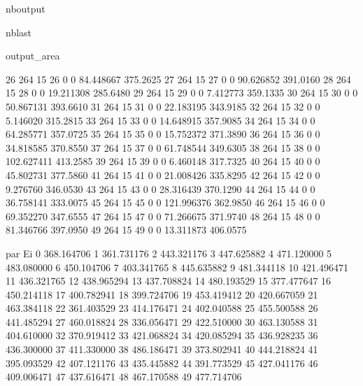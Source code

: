 \documentclass[letterpaper,10pt,english]{sphinxmanual}
\begin{document}
\begin{sphinxuseclass}{nboutput}
\begin{sphinxuseclass}{nblast}
{\begin{sphinxuseclass}{output_area}
\begin{sphinxuseclass}{}
\begin{sphinxVerbatim}[commandchars=\\\{\}]
26  264    15        26      0               0   84.448667  375.2625
27  264    15        27      0               0   90.626852  391.0160
28  264    15        28      0               0   19.211308  285.6480
29  264    15        29      0               0    7.412773  359.1335
30  264    15        30      0               0   50.867131  393.6610
31  264    15        31      0               0   22.183195  343.9185
32  264    15        32      0               0    5.146020  315.2815
33  264    15        33      0               0   14.648915  357.9085
34  264    15        34      0               0   64.285771  357.0725
35  264    15        35      0               0   15.752372  371.3890
36  264    15        36      0               0   34.818585  370.8550
37  264    15        37      0               0   61.748544  349.6305
38  264    15        38      0               0  102.627411  413.2585
39  264    15        39      0               0    6.460148  317.7325
40  264    15        40      0               0   45.802731  377.5860
41  264    15        41      0               0   21.008426  335.8295
42  264    15        42      0               0    9.276760  346.0530
43  264    15        43      0               0   28.316439  370.1290
44  264    15        44      0               0   36.758141  333.0075
45  264    15        45      0               0  121.996376  362.9850
46  264    15        46      0               0   69.352270  347.6555
47  264    15        47      0               0   71.266675  371.9740
48  264    15        48      0               0   81.346766  397.0950
49  264    15        49      0               0   13.311873  406.0575

        par Ei
0   368.164706
1   361.731176
2   443.321176
3   447.625882
4   471.120000
5   483.080000
6   450.104706
7   403.341765
8   445.635882
9   481.344118
10  421.496471
11  436.321765
12  438.965294
13  437.708824
14  480.193529
15  377.477647
16  450.214118
17  400.782941
18  399.724706
19  453.419412
20  420.667059
21  463.384118
22  361.403529
23  414.176471
24  402.040588
25  455.500588
26  441.485294
27  460.018824
28  336.056471
29  422.510000
30  463.130588
31  404.610000
32  370.919412
33  421.068824
34  420.085294
35  436.928235
36  436.300000
37  411.330000
38  486.186471
39  373.802941
40  444.218824
41  395.093529
42  407.121176
43  435.445882
44  391.773529
45  427.041176
46  409.006471
47  437.616471
48  467.170588
49  477.714706
\end{sphinxVerbatim}



\end{sphinxuseclass}
\end{sphinxuseclass}
}

\end{sphinxuseclass}
\end{sphinxuseclass}
\end{document}

